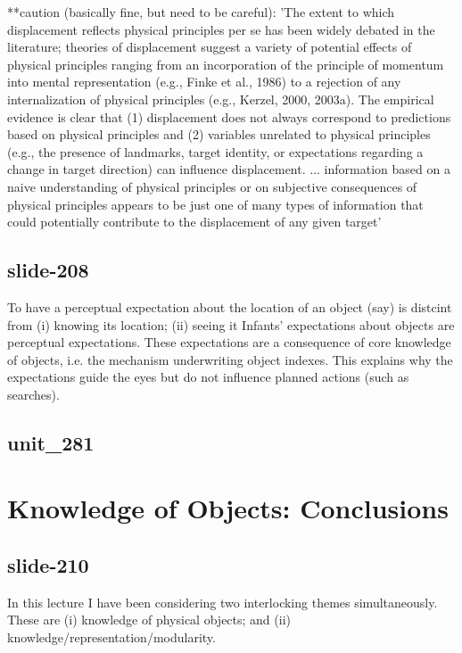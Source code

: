\documentclass[12pt,\papersize]{extarticle}
\begin{document}
**caution (basically fine, but need to be careful): 'The extent to which displacement reflects physical principles per se has been widely debated in the literature; theories of displacement suggest a variety of potential effects of physical principles ranging from an incorporation of the principle of momentum into mental representation (e.g., Finke et al., 1986) to a rejection of any internalization of physical principles (e.g., Kerzel, 2000, 2003a). The empirical evidence is clear that (1) displacement does not always correspond to predictions based on physical principles and (2) variables unrelated to physical principles (e.g., the presence of landmarks, target identity, or expectations regarding a change in target direction) can influence displacement. ... information based on a naive understanding of physical principles or on subjective consequences of physical principles appears to be just one of many types of information that could potentially contribute to the displacement of any given target' \citep[p.\ 842]{hubbard:2005_representational}
 
 
\subsection{slide-208}
To have a perceptual expectation about the location of an object (say) is distcint from (i) knowing its location; (ii) seeing it
Infants' expectations about objects are perceptual expectations.
These expectations are a consequence of core knowledge of objects, i.e. the mechanism underwriting object indexes.
This explains why the expectations guide the eyes but do not influence planned actions (such as searches).
 
 
\subsection{unit\_281}
 
\section{Knowledge of Objects: Conclusions}
 
 
\subsection{slide-210}
In this lecture I have been considering two interlocking themes simultaneously.
These are (i) knowledge of physical objects; and (ii) knowledge/representation/modularity.
 
\end{document}
